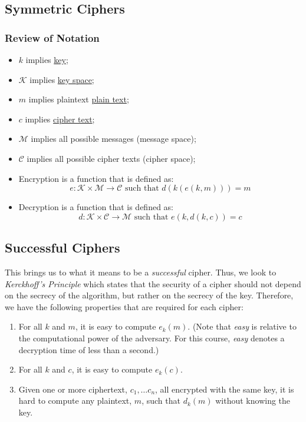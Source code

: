 \subsection{Symmetric Ciphers}


\begin{center}
    \subsubsection{Review of Notation}
\end{center}

\begin{itemize}
    \item \(k\) implies \hyperref[Key]{key};
    \item \(\mathcal{K}\) implies \hyperref[Key Space]{key space};
    \item \(m\) implies plaintext \hyperref[Plain Text]{plain text};
    \item \(c\) implies \hyperref[Cipher Text]{cipher text};
    \item \(\mathcal{M}\) implies all possible messages (message space);
    \item \(\mathcal{C}\) implies all possible cipher texts (cipher space);
    \item Encryption is a function that is defined as: \[e: \mathcal{K} \times \mathcal{M} \rightarrow \mathcal{C} \text{ such that } d(k(e(k,m))) = m\]
    \item Decryption is a function that is defined as: \[d: \mathcal{K} \times \mathcal{C} \rightarrow \mathcal{M} \text{ such that } e(k,d(k,c)) = c\]
\end{itemize}

\subsection{Successful Ciphers}
\label{Successful Ciphers}

This brings us to what it means to be a \textit{successful} cipher. Thus, we look to \textit{Kerckhoff's Principle} which states that the security of a cipher should not depend on the secrecy of the algorithm, but rather on the secrecy of the key. Therefore, we have the following properties that are required for each cipher:
\begin{enumerate}[label=\arabic*.]
    \item For all \(k\) and \(m\), it is easy to compute \(e_k(m)\). (Note that \textit{easy} is relative to the computational power of the adversary. For this course, \textit{easy} denotes a decryption time of less than a second.)
    \item For all \(k\) and \(c\), it is easy to compute \(e_k(c)\).
    \item Given one or more ciphertext, \(c_1,\dots c_n\), all encrypted with the same key, it is hard to compute any plaintext, \(m\), such that \(d_k(m)\) without knowing the key.
\end{enumerate}

